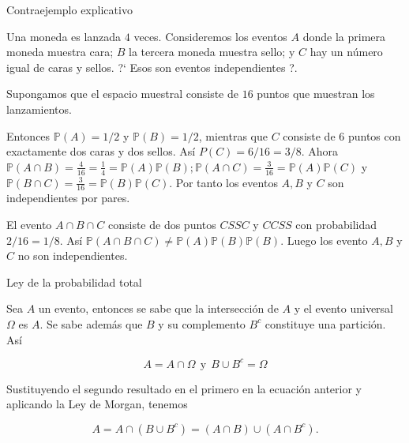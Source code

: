 \documentclass[10pt]{beamer}
\begin{document}
\begin{frame}{Contraejemplo explicativo}
\small{Una moneda es lanzada $4$ veces. Consideremos los eventos $A$ donde la primera moneda muestra cara; $B$ la tercera moneda muestra sello; y $C$ hay un n\'umero igual de caras y sellos. ?` Esos son eventos independientes ?.

Supongamos que el espacio muestral consiste de $16$ puntos que muestran los lanzamientos. 

\vspace{0.2cm}

Entonces $\mathbb{P}(A) = 1/2$ y $\mathbb{P}(B) = 1/2$, mientras que $C$ consiste de $6$ puntos con exactamente dos caras y dos sellos. As\'i $P(C) = 6/16 = 3/8$. Ahora $\mathbb{P}(A \cap B) =\frac{4}{16} = \frac{1}{4} = \mathbb{P}(A)\mathbb{P}(B); \mathbb{P}(A \cap C) = \frac{3}{16} = \mathbb{P}(A)\mathbb{P}(C)$ y $\mathbb{P}(B \cap C) = \frac{3}{16} =  \mathbb{P}(B)\mathbb{P}(C)$. Por tanto los eventos $A, B$ y $C$ son independientes por pares.

\vspace{0.2cm}

El evento $A \cap B \cap C$ consiste de dos puntos $CSSC$ y $CCSS$ con probabilidad $2/16 = 1/8$. As\'i $\mathbb{P}(A \cap B \cap C) \neq \mathbb{P}(A)\mathbb{P}(B)\mathbb{P}(B)$. Luego los evento $A, B$ y $C$ no son independientes.	}
\end{frame}
\begin{frame}{Ley de la probabilidad total }

Sea $A$ un evento, entonces se sabe que la intersecci\'on de $A$ y el evento universal $\Omega$ es $A$. Se sabe adem\'as que $B$ y su complemento $B^c$ constituye una partici\'on. As\'i

\[
A = A \cap \Omega \ \  \text{y}\ \  B \cup B^c = \Omega
\]

\vspace{0.2cm}

Sustituyendo el segundo resultado en el primero en la ecuaci\'on anterior y aplicando la Ley de Morgan, tenemos


\begin{equation*}
A = A \cap ( B \cup B^c) = (A \cap B) \cup (A \cap  B^c).
\end{equation*}

\end{frame}
\end{document}
